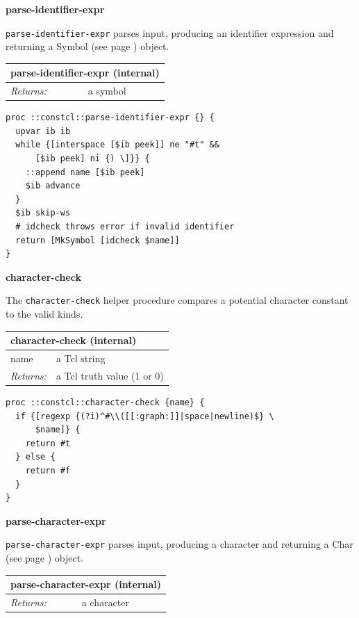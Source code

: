 \documentclass[twoside,9pt]{report}
\begin{document}
\textbf{parse-identifier-expr}


\texttt{parse-identifier-expr} parses input, producing an identifier expression and returning a Symbol (see page \pageref{symbols}) object.

\begin{tabular}{ |l l| }
\hline
\multicolumn{2}{|l|}{parse-identifier-expr (internal)} \\
\hline
\textit{Returns:} & a symbol \\
\hline
\end{tabular}

\noindent\makebox[\linewidth]{\rule{\linewidth}{0.4pt}}
\begin{lstlisting}
proc ::constcl::parse-identifier-expr {} {
  upvar ib ib
  while {[interspace [$ib peek]] ne "#t" &&
      [$ib peek] ni {) \]}} {
    ::append name [$ib peek]
    $ib advance
  }
  $ib skip-ws
  # idcheck throws error if invalid identifier
  return [MkSymbol [idcheck $name]]
}
\end{lstlisting}
\noindent\makebox[\linewidth]{\rule{\linewidth}{0.4pt}}

\textbf{character-check}


The \texttt{character-check} helper procedure compares a potential character constant to the valid kinds.

\begin{tabular}{ |l l| }
\hline
\multicolumn{2}{|l|}{character-check (internal)} \\
\hline
name & a Tcl string \\
\textit{Returns:} & a Tcl truth value (1 or 0) \\
\hline
\end{tabular}

\noindent\makebox[\linewidth]{\rule{\linewidth}{0.4pt}}
\begin{lstlisting}
proc ::constcl::character-check {name} {
  if {[regexp {(?i)^#\\([[:graph:]]|space|newline)$} \
      $name]} {
    return #t
  } else {
    return #f
  }
}
\end{lstlisting}
\noindent\makebox[\linewidth]{\rule{\linewidth}{0.4pt}}

\textbf{parse-character-expr}


\texttt{parse-character-expr} parses input, producing a character and returning a Char (see page \pageref{characters}) object.

\begin{tabular}{ |l l| }
\hline
\multicolumn{2}{|l|}{parse-character-expr (internal)} \\
\hline
\textit{Returns:} & a character \\
\hline
\end{tabular}
\end{document}
